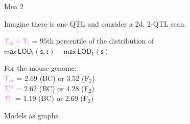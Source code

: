 \documentclass[12pt]{article}
\newcommand{\headsize}{\fontsize{35}{35} \selectfont}
\newcommand{\smallersize}{\fontsize{20}{25} \selectfont}
\newcommand{\lod}{\text{LOD}}
\begin{document}
\newpage

\addtocounter{page}{-1}

\headsize \color{myyellow}
\hfill \begin{minipage}{5.75in}
\centering
Idea 2
\end{minipage}

\vspace{3cm} \color{mywhite} \smallersize

\hfill \begin{minipage}{10in}

Imagine there is one QTL and consider a 2d, 2-QTL scan.

\vspace{1cm}

\hspace*{0.5in} $\mathsf{\color{mypink} T_m + T_i}$ = 95th percentile of the
  distribution of \\[6pt]
\hspace*{2.0in} {\color{myblue} $\mathsf{ \text{max} \, \lod_f(s,t) -
    \text{max} \, \lod_1(s)}$}


\vspace{2cm}

For the mouse genome: \\[12pt]
\hspace*{0.5in} $\mathsf{\color{mypink} T_m}$ = {\color{myblue}
  2.69} (BC) or {\color{myblue} 3.52} (F$_{\mathsf{2}}$) \\[12pt]
\hspace*{0.5in} $\mathsf{\color{mypink} T^H_i}$ = {\color{myblue}
  2.62} (BC) or {\color{myblue} 4.28} (F$_{\mathsf{2}}$) \\[12pt]
\hspace*{0.5in} $\mathsf{\color{mypink} T^L_i}$ = {\color{myblue}
  1.19} (BC) or {\color{myblue} 2.69} (F$_{\mathsf{2}}$)


\end{minipage}









\newpage

\headsize \color{myyellow}
\hfill \begin{minipage}{5.75in}
\centering
Models as graphs
\end{minipage}

\vfill
\end{document}
